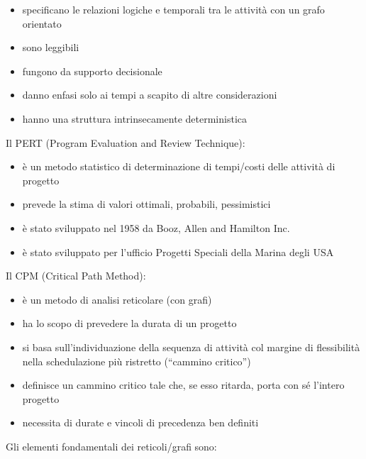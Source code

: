 \documentclass[answers, a4paper, 11pt]{exam}
\begin{document}
\begin{itemize}
    \item specificano le relazioni logiche e temporali tra le attività con un grafo orientato
    \item sono leggibili
    \item fungono da supporto decisionale
    \item danno enfasi solo ai tempi a scapito di altre considerazioni
    \item hanno una struttura intrinsecamente deterministica
\end{itemize}

Il PERT (Program Evaluation and Review Technique):

\begin{itemize}
    \item è un metodo statistico di determinazione di tempi/costi delle attività di progetto
    \item prevede la stima di valori ottimali, probabili, pessimistici
    \item è stato sviluppato nel 1958 da Booz, Allen and Hamilton Inc.
    \item è stato sviluppato per l'ufficio Progetti Speciali della Marina degli USA
\end{itemize}

Il CPM (Critical Path Method):

\begin{itemize}
    \item è un metodo di analisi reticolare (con grafi)
    \item ha lo scopo di prevedere la durata di un progetto
    \item si basa sull'individuazione della sequenza di attività col margine di flessibilità nella schedulazione più ristretto (``cammino critico'')
    \item definisce un cammino critico tale che, se esso ritarda, porta con sé l'intero progetto
    \item necessita di durate e vincoli di precedenza ben definiti
\end{itemize}

Gli elementi fondamentali dei reticoli/grafi sono:
\end{document}
